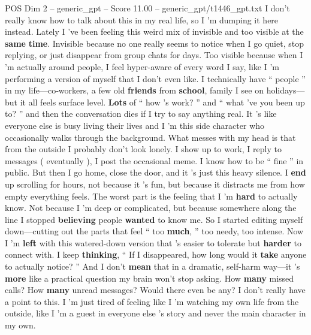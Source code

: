 \begin{textsample}{POS Dim 2 – generic\_gpt – Score 11.00 – generic\_gpt/t1446\_gpt.txt}  \label{ex:f2_pos_037}
I don't really know how to talk about this in my real life, so I ’m dumping it here instead.
Lately I ’ve been feeling this weird mix of invisible and too visible at the \textbf{same} \textbf{time}.
Invisible because no one really seems to notice when I go quiet, stop replying, or just disappear from group chats for days.
Too visible because when I ’m actually around people, I feel hyper-aware of every word I say, like I ’m performing a version of myself that I don't even like.
I technically have “ people ” in my life—co‑workers, a few old \textbf{friends} from \textbf{school}, family I see on holidays—but it all feels surface level. \textbf{Lots} of “ how ’s work? ” and “ what ’ve you been up to? ” and then the conversation dies if I try to say anything real.
It ’s like everyone else is busy living their lives and I ’m this side character who occasionally walks through the background.
What messes with my head is that from the outside I probably don't look lonely.
I show up to work, I reply to messages ( eventually ), I post the occasional meme.
I know how to be “ fine ” in public.
But then I go home, close the door, and it ’s just this heavy silence.
I \textbf{end} up scrolling for hours, not because it ’s fun, but because it distracts me from how empty everything feels.
The worst part is the feeling that I ’m \textbf{hard} to actually know.
Not because I ’m deep or complicated, but because somewhere along the line I stopped \textbf{believing} people \textbf{wanted} to know me.
So I started editing myself down—cutting out the parts that feel “ too \textbf{much}, ” too needy, too intense.
Now I ’m \textbf{left} with this watered-down version that ’s easier to tolerate but \textbf{harder} to connect with.
I keep \textbf{thinking}, “ If I disappeared, how long would it \textbf{take} anyone to actually notice? ” And I don't \textbf{mean} that in a dramatic, self-harm way—it ’s \textbf{more} like a practical question my brain won't stop asking.
How \textbf{many} missed calls?
How \textbf{many} unread messages?
Would there even be any?
I don't really have a point to this.
I ’m just tired of feeling like I ’m watching my own life from the outside, like I ’m a guest in everyone else ’s story and never the main character in my own.

\end{textsample}
